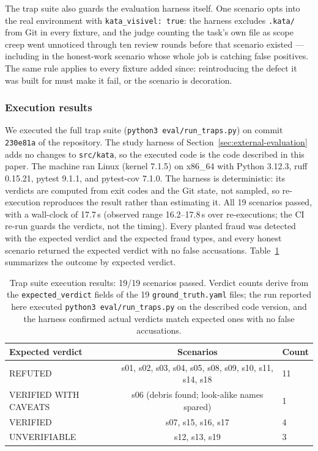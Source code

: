 \documentclass{sbc2019}%
\begin{document}
The trap suite also guards the evaluation harness itself. One scenario
opts into the real environment with \texttt{kata\_visivel: true}: the
harness excludes \texttt{.kata/} from Git in every fixture, and the judge
counting the task's own file as scope creep went unnoticed through ten
review rounds before that scenario existed --- including in the
honest-work scenario whose whole job is catching false positives. The same
rule applies to every fixture added since: reintroducing the defect it was
built for must make it fail, or the scenario is decoration.

\subsubsection{Execution results}

We executed the full trap suite (\texttt{python3 eval/run\_traps.py}) on
commit \texttt{230e81a} of the repository. The study harness of
Section~\ref{sec:external-evaluation} adds no changes to \texttt{src/kata},
so the executed code is the code described in this paper. The machine ran
Linux (kernel 7.1.5) on x86\_64 with Python 3.12.3, ruff 0.15.21, pytest 9.1.1, and
pytest-cov 7.1.0. The harness is deterministic: its verdicts are computed
from exit codes and the Git state, not sampled, so re-execution reproduces
the result rather than estimating it. All 19 scenarios passed, with a
wall-clock of 17.7\,s (observed range 16.2--17.8\,s over re-executions; the CI re-run
guards the verdicts, not the timing). Every planted fraud was detected
with the expected verdict and the expected fraud types, and every honest
scenario returned the expected verdict with no false accusations.
Table~\ref{tab:results} summarizes the outcome by expected verdict.

\begin{table}[!ht]
\caption{Trap suite execution results: 19/19 scenarios passed.
Verdict counts derive from the \texttt{expected\_verdict} fields of the 19
\texttt{ground\_truth.yaml} files; the run reported here executed
\texttt{python3 eval/run\_traps.py} on the described code version, and the
harness confirmed actual verdicts match expected ones with no false
accusations.}
\centering
\begin{tabular}{@{}lcl@{}}
\hline\hline
Expected verdict & Scenarios & Count \\
\hline
REFUTED & s01, s02, s03, s04, s05, s08, s09, s10, s11, s14, s18 & 11 \\
VERIFIED WITH CAVEATS & s06 (debris found; look-alike names spared) & 1 \\
VERIFIED & s07, s15, s16, s17 & 4 \\
UNVERIFIABLE & s12, s13, s19 & 3 \\
\hline\hline
\end{tabular}
\label{tab:results}
\end{table}
\end{document}
